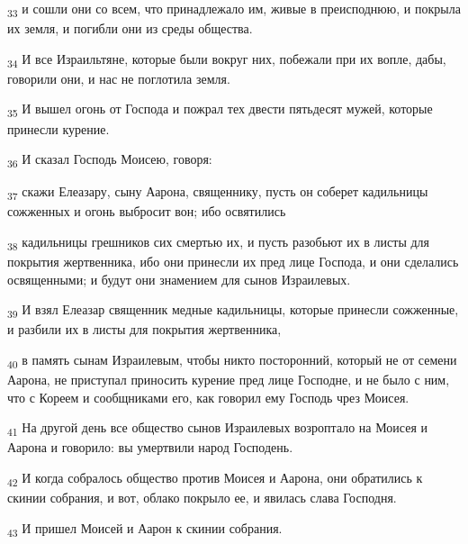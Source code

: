 \begin{tcolorbox}
\textsubscript{33} и сошли они со всем, что принадлежало им, живые в преисподнюю, и покрыла их земля, и погибли они из среды общества.
\end{tcolorbox}
\begin{tcolorbox}
\textsubscript{34} И все Израильтяне, которые были вокруг них, побежали при их вопле, дабы, говорили они, и нас не поглотила земля.
\end{tcolorbox}
\begin{tcolorbox}
\textsubscript{35} И вышел огонь от Господа и пожрал тех двести пятьдесят мужей, которые принесли курение.
\end{tcolorbox}
\begin{tcolorbox}
\textsubscript{36} И сказал Господь Моисею, говоря:
\end{tcolorbox}
\begin{tcolorbox}
\textsubscript{37} скажи Елеазару, сыну Аарона, священнику, пусть он соберет кадильницы сожженных и огонь выбросит вон; ибо освятились
\end{tcolorbox}
\begin{tcolorbox}
\textsubscript{38} кадильницы грешников сих смертью их, и пусть разобьют их в листы для покрытия жертвенника, ибо они принесли их пред лице Господа, и они сделались освященными; и будут они знамением для сынов Израилевых.
\end{tcolorbox}
\begin{tcolorbox}
\textsubscript{39} И взял Елеазар священник медные кадильницы, которые принесли сожженные, и разбили их в листы для покрытия жертвенника,
\end{tcolorbox}
\begin{tcolorbox}
\textsubscript{40} в память сынам Израилевым, чтобы никто посторонний, который не от семени Аарона, не приступал приносить курение пред лице Господне, и не было с ним, что с Кореем и сообщниками его, как говорил ему Господь чрез Моисея.
\end{tcolorbox}
\begin{tcolorbox}
\textsubscript{41} На другой день все общество сынов Израилевых возроптало на Моисея и Аарона и говорило: вы умертвили народ Господень.
\end{tcolorbox}
\begin{tcolorbox}
\textsubscript{42} И когда собралось общество против Моисея и Аарона, они обратились к скинии собрания, и вот, облако покрыло ее, и явилась слава Господня.
\end{tcolorbox}
\begin{tcolorbox}
\textsubscript{43} И пришел Моисей и Аарон к скинии собрания.
\end{tcolorbox}
